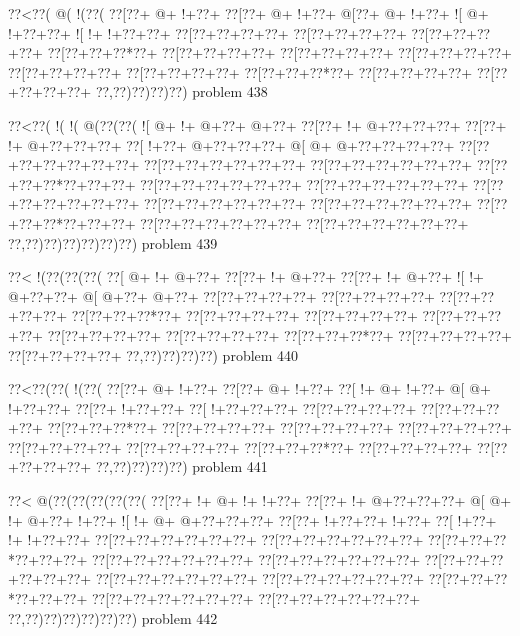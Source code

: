 \vbox{\vbox{\goo
\0??<\0??(\- @(\- !(\0??(
\0??[\0??+\- @+\- !+\0??+
\0??[\0??+\- @+\- !+\0??+
\- @[\0??+\- @+\- !+\0??+
\- ![\- @+\- !+\0??+\0??+
\- ![\- !+\- !+\0??+\0??+
\0??[\0??+\0??+\0??+\0??+
\0??[\0??+\0??+\0??+\0??+
\0??[\0??+\0??+\0??+\0??+
\0??[\0??+\0??+\0??*\0??+
\0??[\0??+\0??+\0??+\0??+
\0??[\0??+\0??+\0??+\0??+
\0??[\0??+\0??+\0??+\0??+
\0??[\0??+\0??+\0??+\0??+
\0??[\0??+\0??+\0??+\0??+
\0??[\0??+\0??+\0??*\0??+
\0??[\0??+\0??+\0??+\0??+
\0??[\0??+\0??+\0??+\0??+
\0??,\0??)\0??)\0??)\0??)
}
\hfil problem 438\hfil\break
}

\vbox{\vbox{\goo
\0??<\0??(\- !(\- !(\- @(\0??(\0??(
\- ![\- @+\- !+\- @+\0??+\- @+\0??+
\0??[\0??+\- !+\- @+\0??+\0??+\0??+
\0??[\0??+\- !+\- @+\0??+\0??+\0??+
\0??[\- !+\0??+\- @+\0??+\0??+\0??+
\- @[\- @+\- @+\0??+\0??+\0??+\0??+
\0??[\0??+\0??+\0??+\0??+\0??+\0??+
\0??[\0??+\0??+\0??+\0??+\0??+\0??+
\0??[\0??+\0??+\0??+\0??+\0??+\0??+
\0??[\0??+\0??+\0??*\0??+\0??+\0??+
\0??[\0??+\0??+\0??+\0??+\0??+\0??+
\0??[\0??+\0??+\0??+\0??+\0??+\0??+
\0??[\0??+\0??+\0??+\0??+\0??+\0??+
\0??[\0??+\0??+\0??+\0??+\0??+\0??+
\0??[\0??+\0??+\0??+\0??+\0??+\0??+
\0??[\0??+\0??+\0??*\0??+\0??+\0??+
\0??[\0??+\0??+\0??+\0??+\0??+\0??+
\0??[\0??+\0??+\0??+\0??+\0??+\0??+
\0??,\0??)\0??)\0??)\0??)\0??)\0??)
}
\hfil problem 439\hfil\break
}

\vbox{\vbox{\goo
\0??<\- !(\0??(\0??(\0??(
\0??[\- @+\- !+\- @+\0??+
\0??[\0??+\- !+\- @+\0??+
\0??[\0??+\- !+\- @+\0??+
\- ![\- !+\- @+\0??+\0??+
\- @[\- @+\0??+\- @+\0??+
\0??[\0??+\0??+\0??+\0??+
\0??[\0??+\0??+\0??+\0??+
\0??[\0??+\0??+\0??+\0??+
\0??[\0??+\0??+\0??*\0??+
\0??[\0??+\0??+\0??+\0??+
\0??[\0??+\0??+\0??+\0??+
\0??[\0??+\0??+\0??+\0??+
\0??[\0??+\0??+\0??+\0??+
\0??[\0??+\0??+\0??+\0??+
\0??[\0??+\0??+\0??*\0??+
\0??[\0??+\0??+\0??+\0??+
\0??[\0??+\0??+\0??+\0??+
\0??,\0??)\0??)\0??)\0??)
}
\hfil problem 440\hfil\break
}

\vbox{\vbox{\goo
\0??<\0??(\0??(\- !(\0??(
\0??[\0??+\- @+\- !+\0??+
\0??[\0??+\- @+\- !+\0??+
\0??[\- !+\- @+\- !+\0??+
\- @[\- @+\- !+\0??+\0??+
\0??[\0??+\- !+\0??+\0??+
\0??[\- !+\0??+\0??+\0??+
\0??[\0??+\0??+\0??+\0??+
\0??[\0??+\0??+\0??+\0??+
\0??[\0??+\0??+\0??*\0??+
\0??[\0??+\0??+\0??+\0??+
\0??[\0??+\0??+\0??+\0??+
\0??[\0??+\0??+\0??+\0??+
\0??[\0??+\0??+\0??+\0??+
\0??[\0??+\0??+\0??+\0??+
\0??[\0??+\0??+\0??*\0??+
\0??[\0??+\0??+\0??+\0??+
\0??[\0??+\0??+\0??+\0??+
\0??,\0??)\0??)\0??)\0??)
}
\hfil problem 441\hfil\break
}

\vbox{\vbox{\goo
\0??<\- @(\0??(\0??(\0??(\0??(\0??(
\0??[\0??+\- !+\- @+\- !+\- !+\0??+
\0??[\0??+\- !+\- @+\0??+\0??+\0??+
\- @[\- @+\- !+\- @+\0??+\- !+\0??+
\- ![\- !+\- @+\- @+\0??+\0??+\0??+
\0??[\0??+\- !+\0??+\0??+\- !+\0??+
\0??[\- !+\0??+\- !+\- !+\0??+\0??+
\0??[\0??+\0??+\0??+\0??+\0??+\0??+
\0??[\0??+\0??+\0??+\0??+\0??+\0??+
\0??[\0??+\0??+\0??*\0??+\0??+\0??+
\0??[\0??+\0??+\0??+\0??+\0??+\0??+
\0??[\0??+\0??+\0??+\0??+\0??+\0??+
\0??[\0??+\0??+\0??+\0??+\0??+\0??+
\0??[\0??+\0??+\0??+\0??+\0??+\0??+
\0??[\0??+\0??+\0??+\0??+\0??+\0??+
\0??[\0??+\0??+\0??*\0??+\0??+\0??+
\0??[\0??+\0??+\0??+\0??+\0??+\0??+
\0??[\0??+\0??+\0??+\0??+\0??+\0??+
\0??,\0??)\0??)\0??)\0??)\0??)\0??)
}
\hfil problem 442\hfil\break
}

